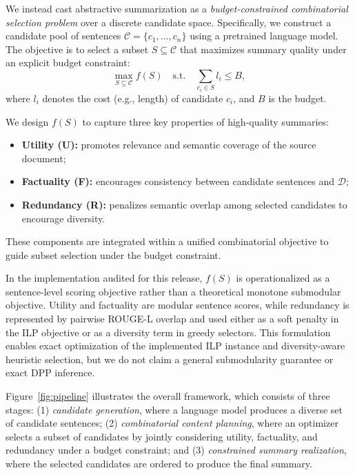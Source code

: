 \documentclass[11pt]{article}
\begin{document}
We instead cast abstractive summarization as a \emph{budget-constrained combinatorial selection problem} over a discrete candidate space. Specifically, we construct a candidate pool of sentences 
$\mathcal{C} = \{c_1, \dots, c_n\}$ 
using a pretrained language model. The objective is to select a subset $S \subseteq \mathcal{C}$ that maximizes summary quality under an explicit budget constraint:
\begin{equation}
\max_{S \subseteq \mathcal{C}} f(S)
\quad \text{s.t.} \quad
\sum_{c_i \in S} l_i \le B,
\end{equation}
where $l_i$ denotes the cost (e.g., length) of candidate $c_i$, and $B$ is the budget.

We design $f(S)$ to capture three key properties of high-quality summaries:
\begin{itemize}
    \item \textbf{Utility (U):} promotes relevance and semantic coverage of the source document;
    \item \textbf{Factuality (F):} encourages consistency between candidate sentences and $\mathcal{D}$;
    \item \textbf{Redundancy (R):} penalizes semantic overlap among selected candidates to encourage diversity.
\end{itemize}
These components are integrated within a unified combinatorial objective to guide subset selection under the budget constraint.

In the implementation audited for this release, $f(S)$ is operationalized as a sentence-level scoring objective rather than a theoretical monotone submodular objective. Utility and factuality are modular sentence scores, while redundancy is represented by pairwise ROUGE-L overlap and used either as a soft penalty in the ILP objective or as a diversity term in greedy selectors. This formulation enables exact optimization of the implemented ILP instance and diversity-aware heuristic selection, but we do not claim a general submodularity guarantee or exact DPP inference.

Figure~\ref{fig:pipeline} illustrates the overall framework, which consists of three stages:
(1) \emph{candidate generation}, where a language model produces a diverse set of candidate sentences;
(2) \emph{combinatorial content planning}, where an optimizer selects a subset of candidates by jointly considering utility, factuality, and redundancy under a budget constraint; and
(3) \emph{constrained summary realization}, where the selected candidates are ordered to produce the final summary.
\end{document}
